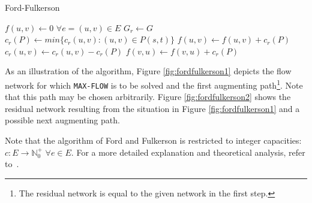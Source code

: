 \documentclass[a4paper,10pt, twocolumn]{article}
\begin{document}
\begin{algorithm}
\caption{Ford-Fulkerson}
\label{algo:fordFulkerson}
\begin{algorithmic}[1]
	\State $f(u,v) \gets 0$ $\forall e=(u,v) \in E$ 
	\State  $G_r \gets G$ 
	\State $c_r(P) \gets min \{c_r(u,v): (u,v) \in P(s,t) \}$
		\State $f(u,v) \gets f(u,v) + c_r(P)$ 
		\State $c_r(u,v) \gets c_r(u,v) - c_r(P)$
		\State $f(v,u) \gets f(v,u) + c_r(P)$ 
	\EndWhile
	\EndFunction
\end{algorithmic}
\end{algorithm}

As an illustration of the algorithm, Figure \ref{fig:fordfulkerson1} depicts the flow network for which \lstinline|MAX-FLOW| is to be solved and the first augmenting path\footnote{The residual network is equal to the given network in the first step.}. Note that this path may be chosen arbitrarily. Figure \ref{fig:fordfulkerson2} shows the residual network resulting from the situation in Figure \ref{fig:fordfulkerson1} and a possible next augmenting path. 

Note that the algorithm of Ford and Fulkerson is restricted to integer capacities:  $c:E\rightarrow \mathbb{N}_0^{+}$ $\forall e \in E$. For a more detailed explanation and theoretical analysis, refer to~\cite{ahuja93}.
\end{document}
